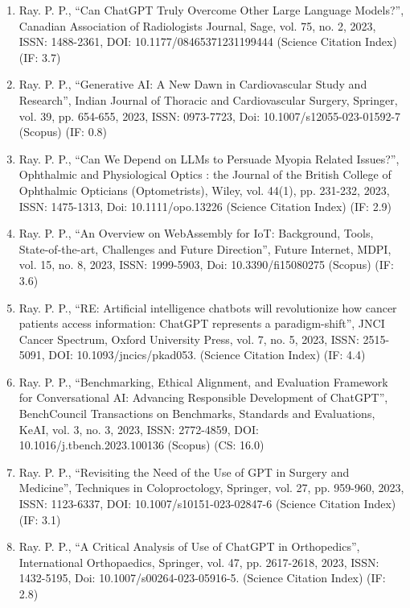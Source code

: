 \documentclass[11pt,a4paper]{moderncv}
\begin{document}
\begin{adjustwidth}{6em}{0pt}
\begin{enumerate}
		\item Ray. P. P., “Can ChatGPT Truly Overcome Other Large Language Models?”, Canadian Association of Radiologists Journal, Sage, vol. 75, no. 2, 2023, ISSN: 1488-2361, DOI: 10.1177/08465371231199444 (Science Citation Index) (IF: 3.7)
		
		\item Ray. P. P., “Generative AI: A New Dawn in Cardiovascular Study and Research”, Indian Journal of Thoracic and Cardiovascular Surgery, Springer, vol. 39, pp. 654-655, 2023, ISSN: 0973-7723, Doi: 10.1007/s12055-023-01592-7 (Scopus) (IF: 0.8)
		
		\item Ray. P. P., “Can We Depend on LLMs to Persuade Myopia Related Issues?”, Ophthalmic and Physiological Optics : the Journal of the British College of Ophthalmic Opticians (Optometrists), Wiley, vol. 44(1), pp. 231-232, 2023, ISSN: 1475-1313, Doi: 10.1111/opo.13226 (Science Citation Index) (IF: 2.9)
		
		\item Ray. P. P., “An Overview on WebAssembly for IoT: Background, Tools, State-of-the-art, Challenges and Future Direction”, Future Internet, MDPI, vol. 15, no. 8, 2023, ISSN: 1999-5903, Doi: 10.3390/fi15080275 (Scopus) (IF: 3.6)
		
		\item Ray. P. P., “RE: Artificial intelligence chatbots will revolutionize how cancer patients access information: ChatGPT represents a paradigm-shift”, JNCI Cancer Spectrum, Oxford University Press, vol. 7, no. 5, 2023, ISSN: 2515-5091, DOI: 10.1093/jncics/pkad053. (Science Citation Index) (IF: 4.4)
		
		\item Ray. P. P., “Benchmarking, Ethical Alignment, and Evaluation Framework for Conversational AI: Advancing Responsible Development of ChatGPT”, BenchCouncil Transactions on Benchmarks, Standards and Evaluations, KeAI, vol. 3, no. 3, 2023, ISSN: 2772-4859, DOI: 10.1016/j.tbench.2023.100136 (Scopus) (CS: 16.0)
		
		\item Ray. P. P., “Revisiting the Need of the Use of GPT in Surgery and Medicine”, Techniques in Coloproctology, Springer, vol. 27, pp. 959-960, 2023, ISSN: 1123-6337, DOI: 10.1007/s10151-023-02847-6 (Science Citation Index) (IF: 3.1)
		
		\item Ray. P. P., “A Critical Analysis of Use of ChatGPT in Orthopedics”, International Orthopaedics, Springer, vol. 47, pp. 2617-2618, 2023, ISSN: 1432-5195, Doi: 10.1007/s00264-023-05916-5. (Science Citation Index) (IF: 2.8)
		

\end{enumerate}
\end{adjustwidth}
\end{document}
